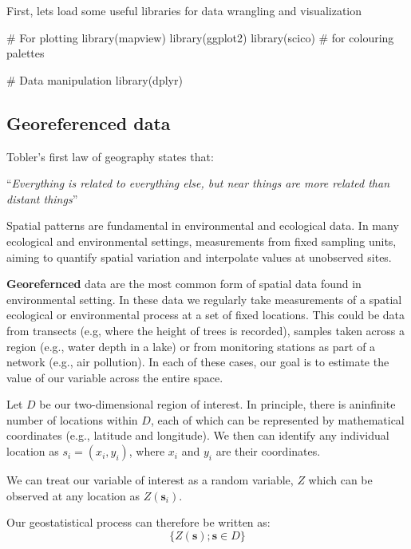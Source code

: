 \documentclass[
  letterpaper,
  DIV=11,
  numbers=noendperiod]{scrartcl}
\newenvironment{Shaded}{\begin{snugshade}}{\end{snugshade}}
\newcommand{\CommentTok}[1]{\textcolor[rgb]{0.37,0.37,0.37}{#1}}
\newcommand{\FunctionTok}[1]{\textcolor[rgb]{0.28,0.35,0.67}{#1}}
\newcommand{\NormalTok}[1]{\textcolor[rgb]{0.00,0.23,0.31}{#1}}
\begin{document}
First, lets load some useful libraries for data wrangling and
visualization

\begin{Shaded}
\begin{Highlighting}[]
\CommentTok{\# For plotting}
\FunctionTok{library}\NormalTok{(mapview)}
\FunctionTok{library}\NormalTok{(ggplot2)}
\FunctionTok{library}\NormalTok{(scico) }\CommentTok{\# for colouring palettes}

\CommentTok{\# Data manipulation}
\FunctionTok{library}\NormalTok{(dplyr)}
\end{Highlighting}
\end{Shaded}

\subsection{Georeferenced data}\label{georeferenced-data}

Tobler's first law of geography states that:

``\emph{Everything is related to everything else, but near things are
more related than distant things}''

Spatial patterns are fundamental in environmental and ecological data.
In many ecological and environmental settings, measurements from fixed
sampling units, aiming to quantify spatial variation and interpolate
values at unobserved sites.

\textbf{Georefernced} data are the most common form of spatial data
found in environmental setting. In these data we regularly take
measurements of a spatial ecological or environmental process at a set
of fixed locations. This could be data from transects (e.g, where the
height of trees is recorded), samples taken across a region (e.g., water
depth in a lake) or from monitoring stations as part of a network (e.g.,
air pollution). In each of these cases, our goal is to estimate the
value of our variable across the entire space.

Let \(D\) be our two-dimensional region of interest. In principle, there
is aninfinite number of locations within \(D\), each of which can be
represented by mathematical coordinates (e.g., latitude and longitude).
We then can identify any individual location as \(s_i = (x_i, y_i)\),
where \(x_i\) and \(y_i\) are their coordinates.

We can treat our variable of interest as a random variable, \(Z\) which
can be observed at any location as \(Z(\mathbf{s}_i)\).

Our geostatistical process can therefore be written as:
\[\{Z(\mathbf{s}); \mathbf{s} \in D\}\]
\end{document}

